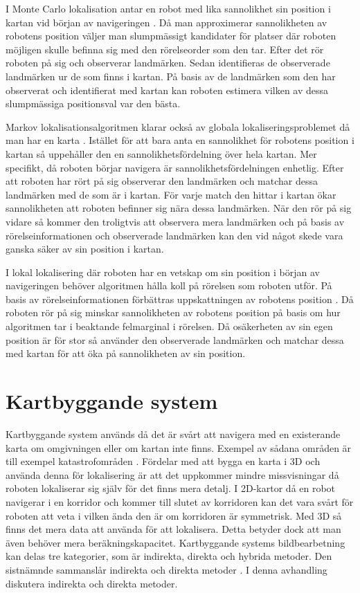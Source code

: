 I Monte Carlo lokalisation antar en robot med lika sannolikhet sin position i kartan vid början av navigeringen \citep{montecarlo}. Då man approximerar sannolikheten av robotens position väljer man slumpmässigt kandidater för platser där roboten möjligen skulle befinna sig med den rörelseorder som den tar. Efter det rör roboten på sig och observerar landmärken. Sedan identifieras de observerade landmärken ur de som finns i kartan. På basis av de landmärken som den har observerat och identifierat med kartan kan roboten estimera vilken av dessa slumpmässiga positionsval var den bästa. 

Markov lokalisationsalgoritmen klarar också av globala lokaliseringsproblemet då man har en karta \citep{ProbabilisticRobotics}. Istället för att bara anta en sannolikhet för robotens position i kartan så uppehåller den en sannolikhetsfördelning över hela kartan. Mer specifikt, då roboten börjar navigera är sannolikhetsfördelningen enhetlig. Efter att roboten har rört på sig observerar den landmärken och matchar dessa landmärken med de som är i kartan. För varje match den hittar i kartan ökar sannolikheten att roboten befinner sig nära dessa landmärken. När den rör på sig vidare så kommer den troligtvis att observera mera landmärken och på basis av rörelseinformationen och observerade landmärken kan den vid något skede vara ganska säker av sin position i kartan.

I lokal lokalisering där roboten har en vetskap om sin position i början av navigeringen behöver algoritmen hålla koll på rörelsen som roboten utför. På basis av rörelseinformationen förbättras uppskattningen av robotens position \citep{montecarlo,ProbabilisticRobotics}. Då roboten rör på sig minskar sannolikheten av robotens position på basis om hur algoritmen tar i beaktande felmarginal i rörelsen. Då osäkerheten av sin egen position är för stor så använder den observerade landmärken och matchar dessa med kartan för att öka på sannolikheten av sin position. 

\section{Kartbyggande system}

Kartbyggande system används då det är svårt att navigera med en existerande karta om omgivningen eller om kartan inte finns. Exempel av sådana områden är till exempel katastrofområden \citep{geospatial}. Fördelar med att bygga en karta i 3D och använda denna för lokalisering är att det uppkommer mindre missvisningar då roboten lokaliserar sig själv för det finns mera detalj. I 2D-kartor då en robot navigerar i en korridor och kommer till slutet av korridoren kan det vara svårt för roboten att veta i vilken ända den är om korridoren är symmetrisk. Med 3D så finns det mera data att använda för att lokalisera. Detta betyder dock att man även behöver mera beräkningskapacitet. Kartbyggande systems bildbearbetning kan delas tre kategorier, som är indirekta, direkta och hybrida metoder. Den sistnämnde sammanslår indirekta och direkta metoder \citep{geospatial}. I denna avhandling diskutera indirekta och direkta metoder.

